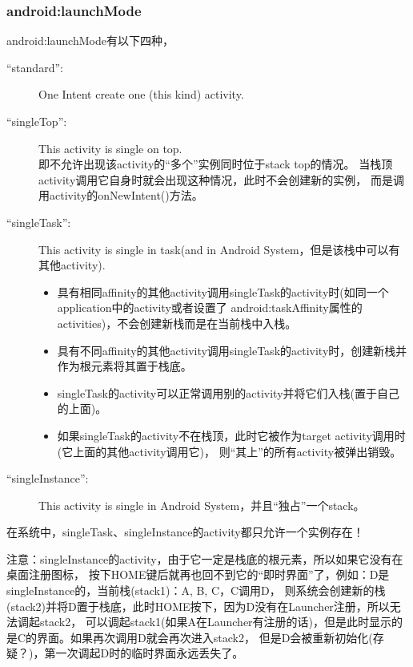 \subsubsection[android:launchMode]{android:launchMode}
android:launchMode有以下四种，
\begin{description}
  \item[``standard'':] One Intent create one (this kind) activity.
  
  \item[``singleTop'':] This activity is single on top. \\
  即不允许出现该activity的“多个”实例同时位于stack top的情况。
  当栈顶activity调用它自身时就会出现这种情况，此时不会创建新的实例，
  而是调用activity的onNewIntent()方法。
  
  \item[``singleTask'':] This activity is single in task(and in Android System，但是该栈中可以有其他activity).
    \begin{itemize}
      \item 具有相同affinity的其他activity调用singleTask的activity时(如同一个application中的activity或者设置了
      android:taskAffinity属性的activities)，不会创建新栈而是在当前栈中入栈。
      \item 具有不同affinity的其他activity调用singleTask的activity时，创建新栈并作为根元素将其置于栈底。
      
      \item singleTask的activity可以正常调用别的activity并将它们入栈(置于自己的上面)。
      
      \item 如果singleTask的activity不在栈顶，此时它被作为target activity调用时(它上面的其他activity调用它)，
      则“其上”的所有activity被弹出销毁。
    \end{itemize}
  
  \item[``singleInstance'':] This activity is single in Android System，并且“独占”一个stack。
\end{description}

在系统中，singleTask、singleInstance的activity都只允许一个实例存在！

注意：singleInstance的activity，由于它一定是栈底的根元素，所以如果它没有在桌面注册图标，
按下HOME键后就再也回不到它的“即时界面”了，例如：D是singleInstance的，当前栈(stack1)：A, B, C，C调用D，
则系统会创建新的栈(stack2)并将D置于栈底，此时HOME按下，因为D没有在Launcher注册，所以无法调起stack2，
可以调起stack1(如果A在Launcher有注册的话)，但是此时显示的是C的界面。如果再次调用D就会再次进入stack2，
但是D会被重新初始化(存疑？)，第一次调起D时的临时界面永远丢失了。

